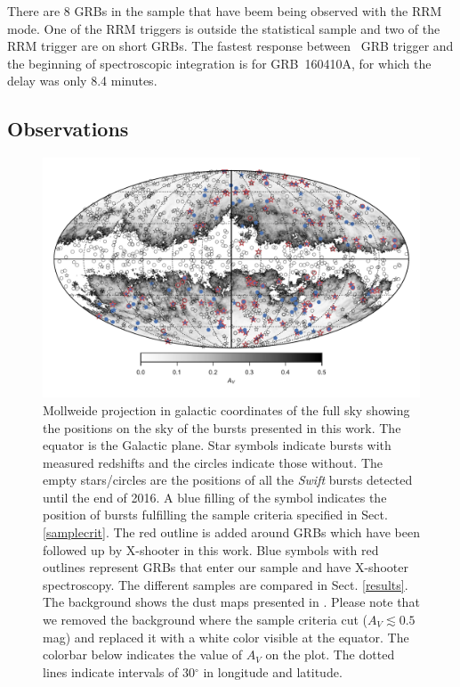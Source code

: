 \documentclass{aa}    %
\begin{document}
There are 8 GRBs in the sample that have beem being observed with the RRM mode.
One of the RRM triggers is outside the statistical sample and two of the RRM
trigger are on short GRBs. The fastest response between \swift~GRB trigger and
the beginning of spectroscopic integration is for GRB~160410A, for which the
delay was only 8.4 minutes.


\subsection{Observations} \label{obs}


\begin{figure}
	\centerline{\includegraphics{figures/skymap.pdf}} \caption{Mollweide projection
	in galactic coordinates of the full sky showing the positions on the sky of the
	bursts presented in this work. The equator is the Galactic plane. Star symbols
	indicate bursts with measured redshifts and the circles indicate those without.
	The empty stars/circles are the positions of all the \textit{Swift} bursts
	detected until the end of 2016. A blue filling of the symbol indicates the
	position of bursts fulfilling the sample criteria specified in Sect.
	\ref{samplecrit}. The red outline is added around GRBs which have been followed
	up by X-shooter in this work. Blue symbols with red outlines represent GRBs
	that enter our sample and have X-shooter spectroscopy. The different samples
	are compared in Sect. \ref{results}. The background shows the dust maps
	presented in \citet{Schlegel1998}. Please note that we removed the background
	where the sample criteria cut ($A_V \lesssim 0.5$ mag) and replaced it with a
	white color visible at the equator. The colorbar below indicates the value of
	$A_V$ on the plot. The dotted lines indicate intervals of 30$^\circ$ in
	longitude and latitude.} \label{fig:skymap}
\end{figure}
\end{document}
